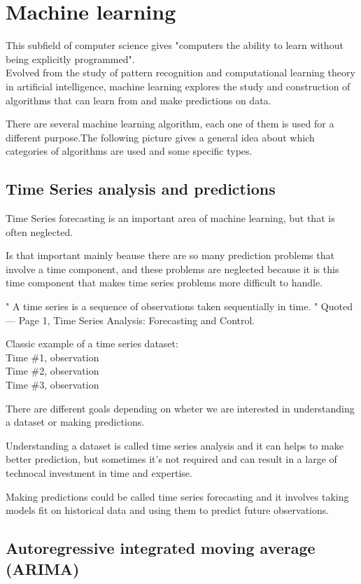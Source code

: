 \newpage

\section{Machine learning}
This subfield of computer science gives "computers the ability to learn without being explicitly programmed". \\Evolved from the study of pattern recognition and computational learning theory in artificial intelligence, machine learning explores the study and construction of algorithms that can learn from and make predictions on data.

There are several machine learning algorithm, each one of them is used for a different purpose.The following picture gives a general idea about which categories of algorithms are used and some specific types.


\subsection{Time Series analysis and predictions}
Time Series forecasting is an important area of machine learning, but that is often neglected.

Is that important mainly beause there are so many prediction problems that involve a time component, and these problems are neglected because it is this time component that makes time series problems more difficult to handle.

" A time series is a sequence of observations taken sequentially in time. "
Quoted — Page 1, Time Series Analysis: Forecasting and Control.

Classic example of a time series dataset:\\ 		
Time \#1, observation\\
Time \#2, observation\\
Time \#3, observation

There are different goals depending on wheter we are interested in understanding a dataset or making predictions.

Understanding a dataset is called time series analysis and it can helps to make better prediction, but sometimes it's not required and can result in a large of technocal investment in time and expertise.

Making predictions could be called time series forecasting and it involves taking models fit on historical data and using them to predict future observations.

\subsection{Autoregressive integrated moving average (ARIMA)}

